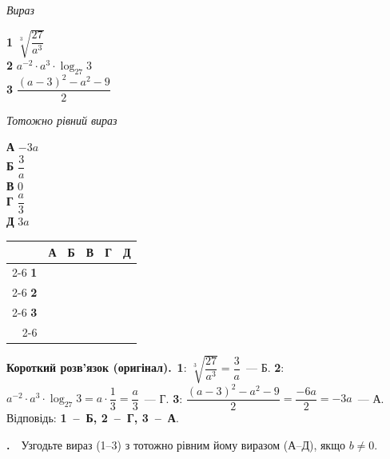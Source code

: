 \documentclass[12pt]{article}
\newcommand{\matchingGrid}{%
    \begingroup
    \renewcommand{\arraystretch}{1.15}
    \setlength{\tabcolsep}{4pt}
    \footnotesize
    \begin{tabular}{r|c|c|c|c|c|}
         \multicolumn{1}{c}{} & \multicolumn{1}{c}{\textbf{А}} & \multicolumn{1}{c}{\textbf{Б}} & \multicolumn{1}{c}{\textbf{В}} & \multicolumn{1}{c}{\textbf{Г}} & \multicolumn{1}{c}{\textbf{Д}} \\ \cline{2-6}
         \textbf{1} & \phantom{X} & \phantom{X} & \phantom{X} & \phantom{X} & \phantom{X} \\ \cline{2-6}
         \textbf{2} & & & & & \\ \cline{2-6}
         \textbf{3} & & & & & \\ \cline{2-6}
    \end{tabular}
    \endgroup
}
\newcounter{zad}
\newcommand{\zadnum}{\stepcounter{zad}\textbf{\thezad.}\ \ }
\newcommand{\solution}[1]{%
\par\vspace{0.12cm}
\begin{tcolorbox}[colback=titleBg!45, colframe=mainGreen!55, boxrule=0.4pt, arc=2pt,
    left=6pt, right=6pt, top=3pt, bottom=3pt, breakable]
\footnotesize\textbf{Короткий розв'язок (оригінал).}\ #1
\end{tcolorbox}
\par\vspace{0.12cm}
}
\begin{document}
\vspace{0.3cm}
\noindent
\begin{minipage}[t]{0.42\textwidth}
\textit{Вираз}\par\vspace{0.2cm}
\textbf{1} \quad $\sqrt[3]{\dfrac{27}{a^3}}$\\[0.55cm]
\textbf{2} \quad $a^{-2}\cdot a^3 \cdot \log_{27} 3$\\[0.4cm]
\textbf{3} \quad $\dfrac{(a-3)^2 - a^2 - 9}{2}$
\end{minipage}
\hfill
\begin{minipage}[t]{0.3\textwidth}
\textit{Тотожно рівний вираз}\par\vspace{0.2cm}
\textbf{А} \quad $-3a$\\[0.2cm]
\textbf{Б} \quad $\dfrac{3}{a}$\\[0.25cm]
\textbf{В} \quad $0$\\[0.2cm]
\textbf{Г} \quad $\dfrac{a}{3}$\\[0.25cm]
\textbf{Д} \quad $3a$
\end{minipage}
\hfill
\begin{minipage}[t]{0.2\textwidth}
\vspace{0.5cm}
\begin{flushright}\matchingGrid\end{flushright}
\end{minipage}

\solution{\textbf{1}: $\sqrt[3]{\dfrac{27}{a^3}} = \dfrac{3}{a}$~--- Б. \textbf{2}: $a^{-2}\cdot a^3\cdot\log_{27}3 = a\cdot\dfrac13 = \dfrac{a}{3}$~--- Г. \textbf{3}: $\dfrac{(a-3)^2 - a^2 - 9}{2} = \dfrac{-6a}{2} = -3a$~--- А. Відповідь: \textbf{1~--~Б, 2~--~Г, 3~--~А}.}

\vspace{0.4cm}
\noindent\zadnum Узгодьте вираз (1--3) з тотожно рівним йому виразом (А--Д), якщо $b \neq 0$.
\end{document}
